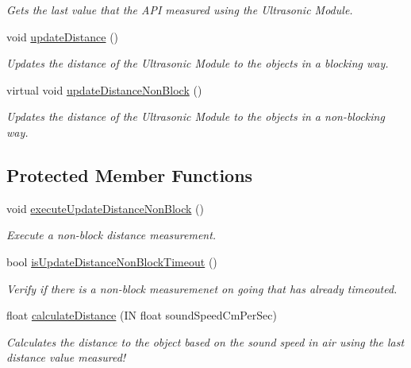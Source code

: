 \begin{DoxyCompactItemize}
\begin{DoxyCompactList}\small\item\em Gets the last value that the A\+PI measured using the Ultrasonic Module. \end{DoxyCompactList}\item 
void \hyperlink{class_easyuino_1_1_distance_meter_non_block_a4ea37c6c0562a76cd03636db329743f9}{update\+Distance} ()
\begin{DoxyCompactList}\small\item\em Updates the distance of the Ultrasonic Module to the objects in a blocking way. \end{DoxyCompactList}\item 
virtual void \hyperlink{class_easyuino_1_1_distance_meter_non_block_ac7163baab744f1393bab3841de0170d4}{update\+Distance\+Non\+Block} ()
\begin{DoxyCompactList}\small\item\em Updates the distance of the Ultrasonic Module to the objects in a non-\/blocking way. \end{DoxyCompactList}\end{DoxyCompactItemize}
\subsection*{Protected Member Functions}
\begin{DoxyCompactItemize}
\item 
\mbox{\label{class_easyuino_1_1_distance_meter_non_block_a5410be2725e26c878ebf9bcdf2b79a05}} 
void \hyperlink{class_easyuino_1_1_distance_meter_non_block_a5410be2725e26c878ebf9bcdf2b79a05}{execute\+Update\+Distance\+Non\+Block} ()
\begin{DoxyCompactList}\small\item\em Execute a non-\/block distance measurement. \end{DoxyCompactList}\item 
bool \hyperlink{class_easyuino_1_1_distance_meter_non_block_a88f2b7e249345b93a8258ae5c7b75a49}{is\+Update\+Distance\+Non\+Block\+Timeout} ()
\begin{DoxyCompactList}\small\item\em Verify if there is a non-\/block measuremenet on going that has already timeouted. \end{DoxyCompactList}\item 
float \hyperlink{class_easyuino_1_1_distance_meter_non_block_aa51eb173540f65e000189ac7137e699a}{calculate\+Distance} (IN float sound\+Speed\+Cm\+Per\+Sec)
\begin{DoxyCompactList}\small\item\em Calculates the distance to the object based on the sound speed in air using the last distance value measured! \end{DoxyCompactList}\end{DoxyCompactItemize}

